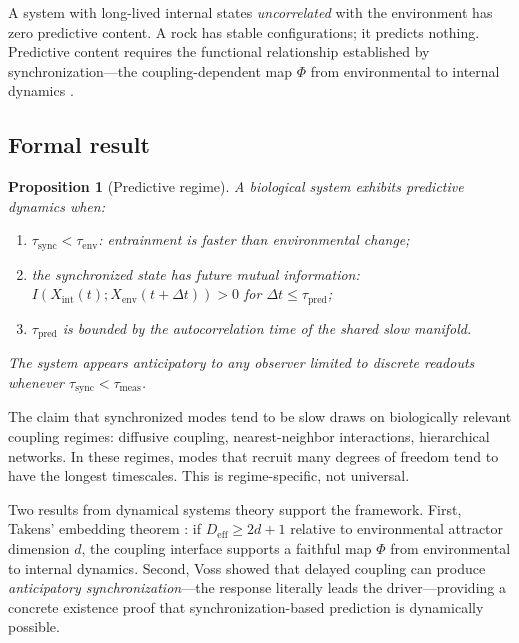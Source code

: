 \documentclass[12pt]{article}
\newtheorem{proposition}{Proposition}
\newcommand{\Deff}{D_{\mathrm{eff}}}
\newcommand{\tsync}{\tau_{\mathrm{sync}}}
\newcommand{\tenv}{\tau_{\mathrm{env}}}
\newcommand{\tmeas}{\tau_{\mathrm{meas}}}
\newcommand{\tpred}{\tau_{\mathrm{pred}}}
\begin{document}
A system with long-lived internal states \textit{uncorrelated} with the environment has zero predictive content. A rock has stable configurations; it predicts nothing. Predictive content requires the functional relationship established by synchronization---the coupling-dependent map $\Phi$ from environmental to internal dynamics \cite{rulkov1995,kocarev1996}.

\subsection{Formal result}
\label{sec:formal_result}

\begin{proposition}[Predictive regime]\label{prop:predictive}
A biological system exhibits predictive dynamics when:
\begin{enumerate}
\item $\tsync < \tenv$: entrainment is faster than environmental change;
\item the synchronized state has future mutual information: $I(X_{\mathrm{int}}(t); X_{\mathrm{env}}(t{+}\Delta t)) > 0$ for $\Delta t \leq \tpred$;
\item $\tpred$ is bounded by the autocorrelation time of the shared slow manifold.
\end{enumerate}
The system appears anticipatory to any observer limited to discrete readouts whenever $\tsync < \tmeas$.
\end{proposition}

\noindent The claim that synchronized modes tend to be slow draws on biologically relevant coupling regimes: diffusive coupling, nearest-neighbor interactions, hierarchical networks. In these regimes, modes that recruit many degrees of freedom tend to have the longest timescales. This is regime-specific, not universal.

Two results from dynamical systems theory support the framework. First, Takens' embedding theorem \cite{takens1981}: if $\Deff \geq 2d + 1$ relative to environmental attractor dimension $d$, the coupling interface supports a faithful map $\Phi$ from environmental to internal dynamics. Second, Voss \cite{voss2000} showed that delayed coupling can produce \textit{anticipatory synchronization}---the response literally leads the driver---providing a concrete existence proof that synchronization-based prediction is dynamically possible.

\medskip
\end{document}

